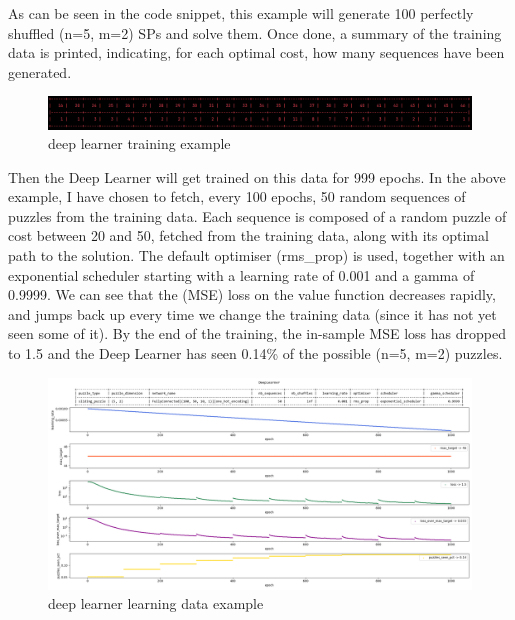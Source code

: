 As can be seen in the code snippet, this example will generate 100 perfectly shuffled (n=5, m=2) SPs and solve them. Once done, a summary of the training data is printed, indicating, for each optimal cost, how many sequences have been generated.

\begin{figure}[H]
\centering
\includegraphics[scale=0.45]{./Figures/exampledeeplearnertraining}
\caption[Examples]{deep learner training example}
\label{fig:exampledeeplearnertraining}
\end{figure}

Then the Deep Learner will get trained on this data for 999 epochs. In the above example, I have chosen to fetch, every 100 epochs, 50 random sequences of puzzles from the training data. Each sequence is composed of a random puzzle of cost between 20 and 50, fetched from the training data, along with its optimal path to the solution. The default optimiser (rms\_prop) is used, together with an exponential scheduler starting with a learning rate of 0.001 and a gamma of 0.9999. We can see that the (MSE) loss on the value function decreases rapidly, and jumps back up every time we change the training data (since it has not yet seen some of it). By the end of the training, the in-sample MSE loss has dropped to 1.5 and the Deep Learner has seen 0.14\% of the possible (n=5, m=2) puzzles.

\begin{landscape}
\centering\vspace*{\fill}
\begin{figure}[H]
\centering
\includegraphics[scale=0.45]{./Figures/exampledeeplearnerlearning}
\caption[Examples]{deep learner learning data example}
\label{fig:exampledeeplearnerlearning}
\end{figure}
\vfill
\end{landscape}
\restoregeometry






